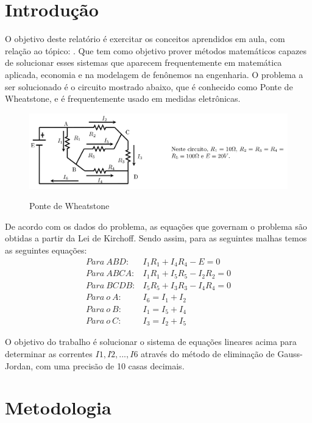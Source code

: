 \documentclass[12pt, hidelinks]{article}
\makeatletter
\let\thetitle\@title
\makeatother
\begin{document}
\section{Introdução}

O objetivo deste relatório é exercitar os conceitos aprendidos em aula, com relação ao tópico: \thetitle.
Que tem como objetivo prover métodos matemáticos capazes de solucionar esses sistemas que aparecem frequentemente
em matemática aplicada, economia e na modelagem de fenônemos na engenharia.
O problema a ser solucionado é o circuito mostrado abaixo, que é conhecido como Ponte de Wheatstone, e é frequentemente usado em medidas eletrônicas.

\begin{figure}[!h]
  \centering
  \includegraphics[width=15cm]{figuras/problema.png}\\
  \caption{Ponte de Wheatstone}\label{fig:ponte}
\end{figure}

De acordo com os dados do problema, as equações que governam o problema são obtidas a partir da Lei de Kirchoff.
Sendo assim, para as seguintes malhas temos as seguintes equações:
\begin{eqnarray}\label{eq:sistema}
  Para~ABD: & I_1R_1+I_4R_4-E=0 \nonumber\\
  Para~ABCA: & I_1R_1+I_5R_5-I_2R_2=0 \nonumber\\
  Para~BCDB: & I_5R_5+I_3R_3-I_4R_4=0 \nonumber\\
  Para~o~A: & I_6=I_1+I_2 \nonumber\\
  Para~o~B: & I_1=I_5+I_4 \nonumber\\
  Para~o~C: & I_3=I_2+I_5
\end{eqnarray}

O objetivo do trabalho é solucionar o sistema de equações lineares acima para determinar as correntes
$I1, I2,...,I6$ através do método de eliminação de Gauss-Jordan, com uma precisão de 10 casas decimais.

\section{Metodologia}
\end{document}
